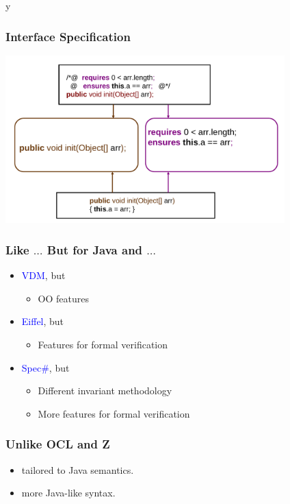 \if y\MAKEHANDOUTS \documentclass[compress,landscape,handout]{beamer}
\begin{document}
\begin{frame}
\frametitle{Interface Specification}
\includegraphics[width=4.25in]{if1}
\end{frame}

\begin{frame}
\frametitle{Like $\ldots$ But for Java and $\ldots$}
\begin{itemize}
\item
\textcolor{blue}{VDM}, but
\begin{itemize}
\item
OO features
\end{itemize}

\item
\textcolor{blue}{Eiffel}, but
\begin{itemize}
\item
Features for formal verification
\end{itemize}

\item
\textcolor{blue}{Spec\#}, but
\begin{itemize}
\item
Different invariant methodology
\item
More features for formal verification
\end{itemize}
\end{itemize}
\end{frame}

\begin{frame}
\frametitle{Unlike OCL and Z}

\begin{itemize}
\item
tailored to Java semantics.

\item
more Java-like syntax.
\end{itemize}

\end{frame}
\end{document}
